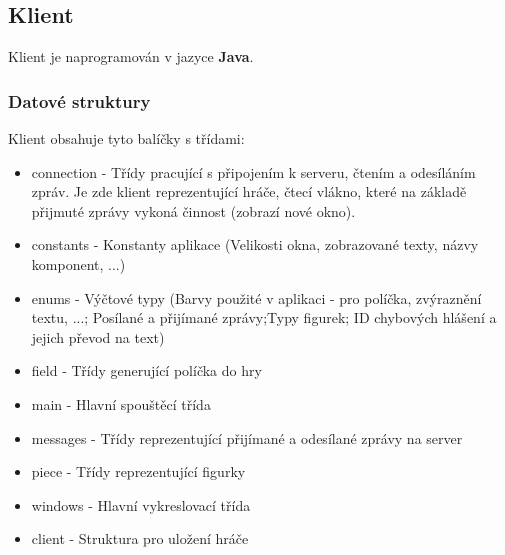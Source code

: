 \documentclass[12pt, a4paper]{article}
\begin{document}
\subsection{Klient}
\label{Klient}
Klient je naprogramován v jazyce \textbf{Java}.
\subsubsection{Datové struktury}
\label{Klient_Datové_struktury}
Klient obsahuje tyto balíčky s třídami:
\begin{itemize}
\item connection - Třídy pracující s připojením k serveru, čtením a odesíláním zpráv. Je zde klient reprezentující hráče, čtecí vlákno, které na základě přijmuté zprávy vykoná činnost (zobrazí nové okno).
\item constants - Konstanty aplikace (Velikosti okna, zobrazované texty, názvy komponent, ...)
\item enums - Výčtové typy (Barvy použité v aplikaci - pro políčka, zvýraznění textu, ...; Posílané a přijímané zprávy;Typy figurek; ID chybových hlášení a jejich převod na text)
\item field - Třídy generující políčka do hry
\item main -  Hlavní spouštěcí třída
\item messages - Třídy reprezentující přijímané a odesílané zprávy na server
\item piece - Třídy reprezentující figurky
\item windows - Hlavní vykreslovací třída 
\item client - Struktura pro uložení hráče
\end{itemize}
\end{document}
